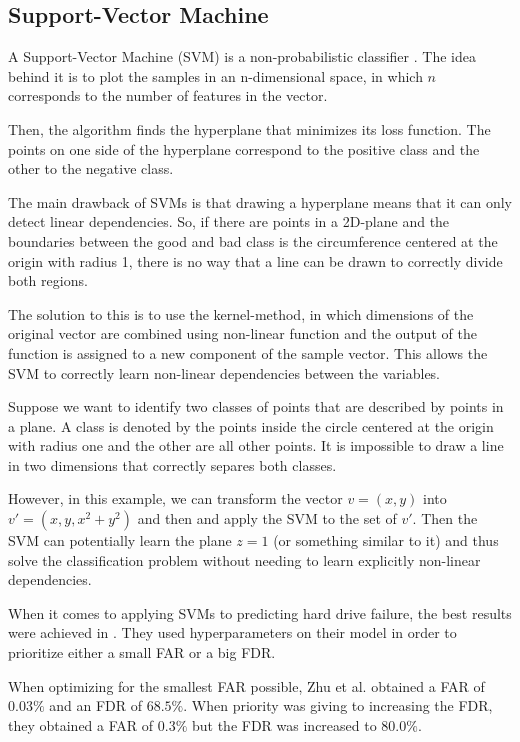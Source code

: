 \subsection{Support-Vector Machine}

A Support-Vector Machine (SVM) is a non-probabilistic classifier \cite{cortes1995support}.
The idea behind it is to plot the samples in an n-dimensional space, in which $n$ corresponds to the number of features in the vector.

Then, the algorithm finds the hyperplane that minimizes its loss function.
The points on one side of the hyperplane correspond to the positive class and the other to the negative class.

The main drawback of SVMs is that drawing a hyperplane means that it can only detect linear dependencies.
So, if there are points in a 2D-plane and the boundaries between the good and bad class is the circumference centered at the origin with radius 1, there is no way that a line can be drawn to correctly divide both regions.

The solution to this is to use the kernel-method, in which dimensions of the original vector are combined using non-linear function and the output of the function is assigned to a new component of the sample vector.
This allows the SVM to correctly learn non-linear dependencies between the variables.

Suppose we want to identify two classes of points that are described by points in a plane.
A class is denoted by the points inside the circle centered at the origin with radius one and the other are all other points.
It is impossible to draw a line in two dimensions that correctly separes both classes.

However, in this example, we can transform the vector $v = (x, y)$ into $v' = (x, y, x^2 + y^2)$ and then and apply the SVM to the set of $v'$.
Then the SVM can potentially learn the plane $z = 1$ (or something similar to it) and thus solve the classification problem without needing to learn explicitly non-linear dependencies.

When it comes to applying SVMs to predicting hard drive failure, the best results were achieved in \cite{Zhu13}.
They used hyperparameters on their model in order to prioritize either a small FAR or a big FDR.

When optimizing for the smallest FAR possible, Zhu et al. obtained a FAR of $0.03\%$ and an FDR of $68.5\%$.
When priority was giving to increasing the FDR, they obtained a FAR of $0.3\%$ but the FDR was increased to $80.0\%$.

